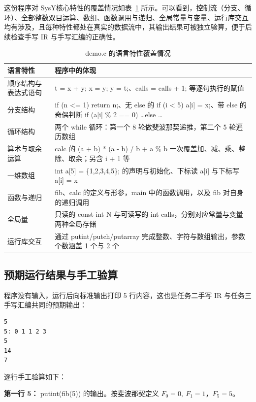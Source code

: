 \documentclass[UTF8,a4paper,10pt]{ctexart}
\newcommand{\headcol}{\bfseries}
\begin{document}
这份程序对 SysY核心特性的覆盖情况如表~\ref{tab:democover} 所示。可以看到，控制流（分支、循环）、全部整数双目运算、数组、函数调用与递归、全局常量与变量、运行库交互均有涉及，且每种特性都处在真实的数据流中，其输出结果可被独立验算，便于后续检查手写 IR 与手写汇编的正确性。

\begin{table}[H]
  \centering
  \small
  \setlength{\tabcolsep}{4pt}
  \begin{tabular}{>{\centering\arraybackslash}p{3.0cm}>{\centering\arraybackslash}p{10.5cm}}
    \toprule
\headcol 语言特性 & \headcol 程序中的体现 \\
    \midrule
顺序结构与表达式语句 & t = x + y; x = y; y = t;、calls = calls + 1; 等逐句执行的赋值 \\
    分支结构 & if (n <= 1) return n;、无 else 的 if (i < 5) a[i] = x;、带 else 的奇偶判断 if (a[i] \% 2 == 0) \dots else \dots \\
    循环结构 & 两个 while 循环：第一个 8 轮做斐波那契递推，第二个 5 轮遍历数组 \\
    算术与取余运算 & calc 的 (a + b) * (a - b) / b + a \% b 一次覆盖加、减、乘、整除、取余；另含 i + 1 等 \\
    一维数组 & int a[5] = \{1,2,3,4,5\}; 的声明与初始化、下标读 a[i] 与下标写 a[i] = x \\
    函数与递归 & fib、calc 的定义与形参，main 中的函数调用，以及 fib 对自身的递归调用 \\
    全局量 & 只读的 const int N 与可读写的 int calls，分别对应常量与变量两种全局存储 \\
    运行库交互 & 通过 putint/putch/putarray 完成整数、字符与数组输出，参数个数涵盖 1 个与 2 个 \\
    \bottomrule
\end{tabular}
  \caption{demo.c 的语言特性覆盖情况}
  \label{tab:democover}
\end{table}

\subsection{预期运行结果与手工验算}

程序没有输入，运行后向标准输出打印 5 行内容，这也是任务二手写 IR 与任务三手写汇编共同的预期输出：

\begin{lstlisting}
5
5: 0 1 1 2 3
5
14
7
\end{lstlisting}

逐行手工验算如下：

\noindent\textbf{第一行 5：} putint(fib(5)) 的输出。按斐波那契定义 $F_0=0,\ F_1=1$，$F_5=5$。
\end{document}
